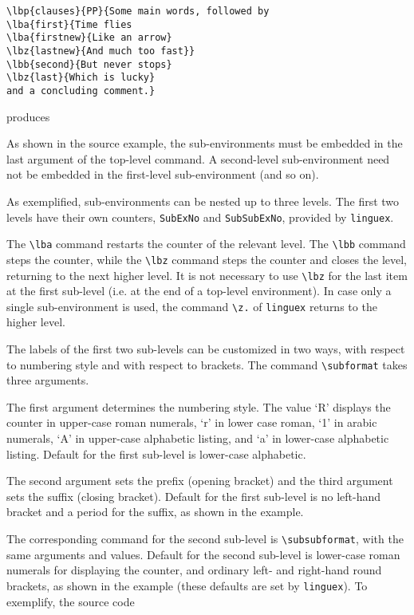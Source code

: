 \documentclass[10pt]{article}
\newcommand{\qut}[1]{`#1'}
\begin{document}
\begin{verbatim}
\lbp{clauses}{PP}{Some main words, followed by 
\lba{first}{Time flies
\lba{firstnew}{Like an arrow} 
\lbz{lastnew}{And much too fast}}
\lbb{second}{But never stops}
\lbz{last}{Which is lucky}
and a concluding comment.}
\end{verbatim}
produces

	As shown in the source example, the sub-environments must be embedded in the last argument of the top-level command. A second-level sub-environment need not be embedded in the first-level sub-environment (and so on).
	
As exemplified, sub-environments can be nested up to three levels. The first two levels have their own counters, \verb+SubExNo+ and \verb+SubSubExNo+, provided by \verb+linguex+.
	
The \verb+\lba+ command restarts the counter of the relevant level. The \verb+\lbb+ command steps the counter, while the \verb+\lbz+ command steps the counter and closes the level, returning to the next higher level. It is not necessary to use \verb+\lbz+ for the last item at the first sub-level (i.e. at the end of a top-level environment). In case only a single sub-environment is used, the command \verb+\z.+ of \verb+linguex+ returns to the higher level.

The labels of the first two sub-levels can be  customized in two ways, with respect to numbering style and with respect to brackets. The command \verb+\subformat+ takes three arguments. 

The first argument determines the numbering style. The value \qut{R} displays the counter in upper-case roman numerals, \qut{r} in lower case roman, \qut{1} in arabic numerals, \qut{A} in upper-case alphabetic listing, and \qut{a} in lower-case alphabetic listing. Default for the first sub-level is lower-case alphabetic.

The second argument sets the prefix (opening bracket) and the third argument sets the suffix (closing bracket). Default for the first sub-level is no left-hand bracket and a period for the suffix, as shown in the example.

The corresponding command for the second sub-level is \verb+\subsubformat+, with the same arguments and values. Default for the second sub-level is lower-case roman numerals for displaying the counter, and ordinary left- and right-hand round brackets, as shown in the example (these defaults are set by \verb+linguex+).  To exemplify, the source code
\end{document}
